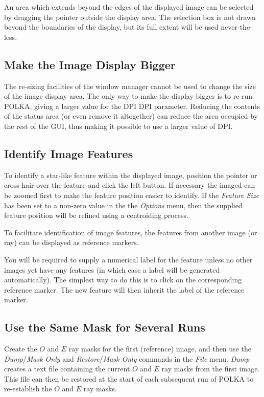 \documentclass[11pt]{article}
\newcommand{\htmlref}[2]{#1}
\newcommand{\xref}[3]{#1}
\newcommand{\xlabel}[1]{}
\newcommand{\mylabel}[1] {\xlabel{#1}\label{#1}}
\begin{document}
An area which extends beyond the edges of the displayed image can be
selected by dragging the pointer outside the display area. The selection
box is not drawn beyond the boundaries of the display, but its full extent
will be used never-the-less.

\subsection {\mylabel{POLKA_BIGGER_IMAGE}Make the Image Display Bigger}
The re-sizing facilities of the window manager cannot be used to change
the size of the image display area. The only way to make the display
bigger is to re-run POLKA, giving a larger value for the
\xref{DPI}{sun223}{POLKA} DPI parameter. Reducing the contents of the
\htmlref{status area}{POLKA_STATUS_AREA} (or even remove it altogether)
can reduce the area occupied by the rest of the GUI, thus making it
possible to use a larger value of DPI.

\subsection {\mylabel{POLKA_IDENTIFYING_FEATURES}Identify Image Features}
To identify a star-like feature within the displayed image, position the
pointer or cross-hair over the feature and click the left button. If
necessary the imaged can be \htmlref{zoomed}{POLKA_ZOOM} first to make the
feature position easier to identify. If the \htmlref{\emph{Feature
Size}}{POLKA_FEATURE_SIZE} has been set to a non-zero value in the
the \htmlref{\emph{Options}} {POLKA_OPTIONS_MENU} menu, then the supplied
feature position will be refined using a centroiding process.

To facilitate identification of image features, the features from another
image (or ray) can be displayed as \htmlref{reference}{POLKA_REFERENCE}
markers.

You will be required to supply a numerical label for the feature unless
no other images yet have any features (in which case a label will be
generated automatically). The simplest way to do this is to click on
the corresponding reference marker. The new feature will then inherit the
label of the reference marker.

\subsection {\mylabel{POLKA_SAME_MASKS}Use the Same Mask for Several Runs}
Create the $O$ and $E$ ray masks for the first (reference) image, and
then use the \htmlref{\emph{Dump}}{POLKA_DUMP}/\emph{Mask Only} and
\htmlref{\emph{Restore}}{POLKA_RESTORE}/\emph{Mask Only} commands in the
\htmlref{\emph{File}}{POLKA_FILE_MENU} menu. \emph{Dump} creates a text file
containing the current $O$ and $E$ ray masks from the first image. This
file can then be restored at the start of each subsequent run of POLKA to
re-establish the $O$ and $E$ ray masks.
\end{document}
